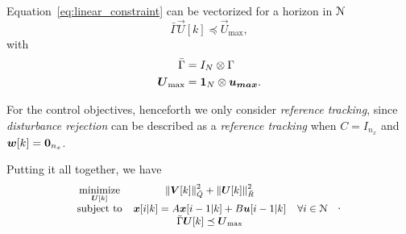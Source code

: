 \documentclass[../main.tex]{subfiles}
\begin{document}
Equation~\eqref{eq:linear_constraint} can be vectorized for a horizon in $\mathcal{N}$
\begin{equation}
\bar{\Gamma}\vec{U}[k]\preceq {\vec{U}}_{\text{max}},
\end{equation}
with
\begin{align}
  \label{eq:construction_Gamma}
 \bar{\Gamma}&=I_{N}\otimes\Gamma\\
  \label{eq:construction_Umax}
   \boldsymbol{U}_{\max}&=\mathbf{1}_{N}\otimes\boldsymbol{u_{max}}.
\end{align}


For the control objectives, henceforth we only consider \emph{reference tracking}, since \emph{disturbance rejection} can be described as a \emph{reference tracking} when ${ C=I_{n_{x}} }$ and ${ \boldsymbol{w}[k]=\mathbf{0}_{n_{x}} }$.

Putting it all together, we have
\begin{equation}
  \small
  \begin{aligned}
    \begin{matrix}
      \mathop{\textrm{minimize}}\limits_{\boldsymbol{U}[k]} &\left\lVert\boldsymbol{V}[k]\right\rVert^{2}_{\bar{Q}} + \left\lVert\boldsymbol{U}[k] \right\rVert^{2}_{\bar{R}}&\\
      \mathrm{subject~ to} &
      \boldsymbol{x}[i|k]=A\boldsymbol{x}[i-1|k]+B\boldsymbol{u}[i-1|k]
      &
       \forall i\in\mathcal{N} \\
      &\bar{\Gamma}\boldsymbol{U}[k]\preceq {\boldsymbol{U}}_{\text{max}}&

    \end{matrix}
  \end{aligned}
  \label{eq:general_qp}
  \quad.
\end{equation}
\end{document}
